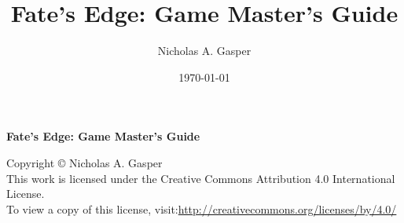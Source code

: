 \documentclass[11pt]{book}
\title{Fate's Edge: Game Master's Guide}
\author{Nicholas A. Gasper}
\date{\today}
\begin{document}
\frontmatter 
\maketitle

\cleardoublepage 
\thispagestyle{empty} 
\begin{center} 
\vspace*{2in} 
\textbf{Fate's Edge: Game Master's Guide}

\vspace{0.2in} Copyright 
\copyright 
Nicholas A. Gasper \\ 
\vspace{0.2in} This work is licensed under the Creative Commons Attribution 4.0 International License.\\
To view a copy of this license, visit:\url{http://creativecommons.org/licenses/by/4.0/} 
\end{center} 
\cleardoublepage

\tableofcontents

\mainmatter













\backmatter 
\printindex
\end{document}
